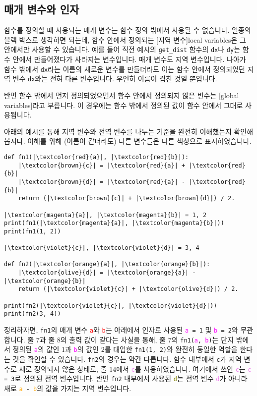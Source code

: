 \documentclass[../main.tex]{subfiles}
\begin{document}
\subsection{매개 변수와 인자}
함수를 정의할 때 사용되는 매개 변수는 함수 정의 밖에서 사용될 수 없습니다.
일종의 블랙 박스로 생각하면 되는데, 함수 안에서 정의되는 [지역 변수]{local variables}은 그 안에서만 사용할 수 있습니다.
예를 들어 직전 예시의 \verb/get_dist/ 함수의 \texttt{dx}나 \texttt{dy}는 함수 안에서
만들어졌다가 사라지는 변수입니다.
매개 변수도 지역 변수입니다.
나아가 함수 밖에서 \texttt{dx}라는 이름의 새로운 변수를 만들더라도 이는 함수 안에서 정의되었던 지역 변수 \texttt{dx}와는 전혀 다른 변수입니다.
우연히 이름이 겹친 것일 뿐입니다.

반면 함수 밖에서 먼저 정의되었으면서 함수 안에서 정의되지 않은 변수는 [global variables]라고 부릅니다.
이 경우에는 함수 밖에서 정의된 값이 함수 안에서 그대로 사용됩니다.

아래의 예시를 통해 지역 변수와 전역 변수를 나누는 기준을 완전히 이해했는지 확인해봅시다.
이해를 위해 (이름이 같더라도) 다른 변수들은 다른 색상으로 표시하였습니다.
\begin{verbatim}
def fn1(|\textcolor{red}{a}|, |\textcolor{red}{b}|):
    |\textcolor{brown}{c}| = |\textcolor{red}{a}| + |\textcolor{red}{b}|
    |\textcolor{brown}{d}| = |\textcolor{red}{a}| - |\textcolor{red}{b}|
    return (|\textcolor{brown}{c}| + |\textcolor{brown}{d}|) / 2.

|\textcolor{magenta}{a}|, |\textcolor{magenta}{b}| = 1, 2
print(fn1(|\textcolor{magenta}{a}|, |\textcolor{magenta}{b}|))
print(fn1(1, 2))

|\textcolor{violet}{c}|, |\textcolor{violet}{d}| = 3, 4

def fn2(|\textcolor{orange}{a}|, |\textcolor{orange}{b}|):
    |\textcolor{olive}{d}| = |\textcolor{orange}{a}| - |\textcolor{orange}{b}|
    return (|\textcolor{violet}{c}| + |\textcolor{olive}{d}|) / 2.

print(fn2(|\textcolor{violet}{c}|, |\textcolor{violet}{d}|))
print(fn2(3, 4))
\end{verbatim}
정리하자면, \verb/fn1/의 매개 변수 \texttt{\textcolor{red}{a}}와
\texttt{\textcolor{red}{b}}는 아래에서 인자로 사용된
\texttt{\textcolor{magenta}{a} = 1} 및 \texttt{\textcolor{magenta}{b} = 2}와
무관합니다.  줄 7과 줄 8의 출력 값이 같다는 사실을 통해, 줄 7의
\texttt{fn1(\textcolor{magenta}{a}, \textcolor{magenta}{b})}는 단지 밖에서
정의된 \texttt{\textcolor{magenta}{a}}의 값인 1과
\texttt{\textcolor{magenta}{b}}의 값인 2를 대입한 \texttt{fn1(1, 2)}와 완전히
동일한 역할을 한다는 것을 확인할 수 있습니다.  \texttt{fn2}의 경우는
약간 다릅니다.  함수 내부에서 \texttt{c}가 지역 변수로 새로 정의되지 않은
상태로, 줄 14에서 \texttt{\textcolor{violet}{c}}를 사용하였습니다.  여기에서
쓰인 \texttt{\textcolor{violet}{c}}는 \texttt{\textcolor{violet}{c} = 3}로
정의된 전역 변수입니다.  반면 \texttt{fn2} 내부에서 사용된
\texttt{\textcolor{olive}{d}}는 전역 변수 \texttt{\textcolor{violet}{d}}가
아니라 새로 \texttt{\textcolor{orange}{a} - \textcolor{orange}{b}}의 값을
가지는 지역 변수입니다.
\end{document}
